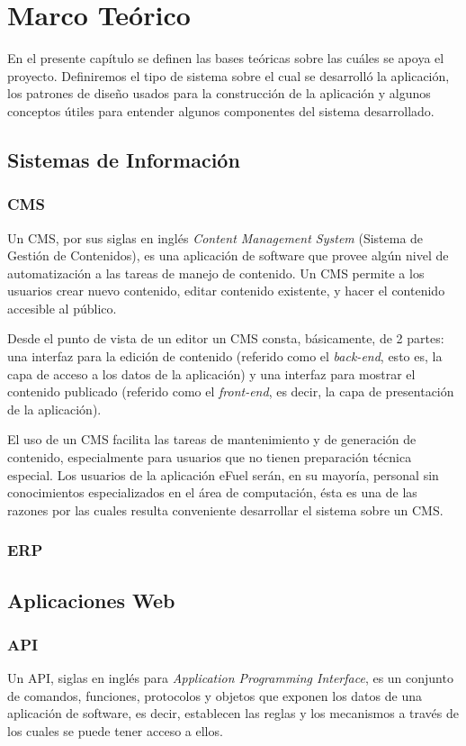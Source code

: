 \chapter{Marco Teórico}
En el presente capítulo se definen las bases teóricas sobre las cuáles se apoya el proyecto. Definiremos el tipo de sistema sobre el cual se desarrolló la aplicación, los patrones de diseño usados para la construcción de la aplicación y algunos conceptos útiles para entender algunos componentes del sistema desarrollado.

\section{Sistemas de Información}
    \subsection{CMS}
    Un CMS, por sus siglas en inglés \textit{Content Management System} (Sistema de Gestión de Contenidos), es una aplicación de software que provee algún nivel de automatización a las tareas de manejo de contenido. Un CMS permite a los usuarios crear nuevo contenido, editar contenido existente, y hacer el contenido accesible al público. \cite{cmsBarker}

    Desde el punto de vista de un editor un CMS consta, básicamente, de 2 partes: una interfaz para la edición de contenido (referido como el \textit{back-end}, esto es, la capa de acceso a los datos de la aplicación) y una interfaz para mostrar el contenido publicado (referido como el \textit{front-end}, es decir, la capa de presentación de la aplicación).

    El uso de un CMS facilita las tareas de mantenimiento y de generación de contenido, especialmente para usuarios que no tienen preparación técnica especial. Los usuarios de la aplicación eFuel serán, en su mayoría, personal sin conocimientos especializados en el área de computación, ésta es una de las razones por las cuales resulta conveniente desarrollar el sistema sobre un CMS.

    \subsection{ERP}

\section{Aplicaciones Web}
    \subsection{API}
    Un API, siglas en inglés para \textit{Application Programming Interface}, es un conjunto de comandos, funciones, protocolos y objetos que exponen los datos de una aplicación de software, es decir, establecen las reglas y los mecanismos a través de los cuales se puede tener acceso a ellos. \cite{apiChristensson}

